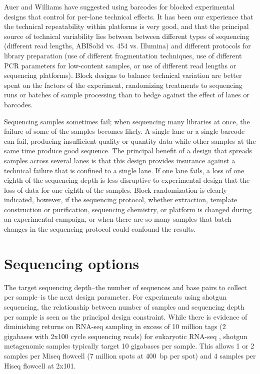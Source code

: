 \documentclass[graybox]{svmult}
\begin{document}
Auer\cite{Auer2010Statistical} and Williams\cite{Williams2001RNAseq} have suggested using barcodes for blocked experimental designs that control for per-lane technical effects.   It has been our experience that the technical repeatability within platforms is very good, and that the principal source of technical variability lies between between different types of sequencing (different read lengths, ABISolid vs. 454 vs. Illumina) and different protocols for library preparation (use of different fragmentation techniques, use of different PCR parameters for low-content samples, or use of different read lengths or sequencing platforms).  Block designs to balance technical variation are better spent on the factors of the experiment, randomizing treatments to sequencing runs or batches of sample processing than to hedge against the effect of lanes or barcodes.  

Sequencing samples sometimes fail; when sequencing many libraries at once, the failure of some of the samples becomes likely.    
A single lane or a single barcode can fail, producing insufficient quality or quantity data while other samples at the same time produce good sequence.
The principal benefit of a design that spreads samples across several lanes is that this design provides insurance against a technical failure that is confined to a single lane.  If one lane fails, a loss of one eighth of the sequencing depth is less disruptive to experimental design that the loss of data for one eighth of the samples.   Block randomization is clearly indicated, however, if the sequencing protocol, whether extraction, template construction or purification, sequencing chemistry, or platform is changed during an experimental campaign, or when there are so many samples that batch changes in the sequencing protocol could confound the results.

\section{Sequencing options }
\label{sec:2}
%

The target sequencing depth--the number of sequences and base pairs to collect per sample--is the next design parameter.  For experiments using shotgun sequencing, the relationship between number of samples and sequencing depth per sample is seen as the principal design constraint. \cite{Auer2010Statistical}    While there is evidence of diminishing returns on RNA-seq sampling in excess of 10 million tags (2 gigabases with 2x100 cycle sequencing reads) for eukaryotic RNA-seq \cite{Wang2011Evaluation}, shotgun metagenomic samples typically target 10 gigabases per sample.     This allows 1 or 2 samples per Miseq flowcell  (7 million spots at 400~bp per spot) and 4 samples per Hiseq flowcell at 2x101.
\end{document}
